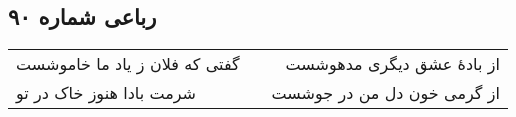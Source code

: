 \begin{center}
\section*{رباعی شماره ۹۰}
\label{sec:sh090}
\begin{longtable}{l p{0.5cm} r}
گفتی که فلان ز یاد ما خاموشست
&&
از بادهٔ عشق دیگری مدهوشست
\\
شرمت بادا هنوز خاک در تو
&&
از گرمی خون دل من در جوشست
\\
\end{longtable}
\end{center}

